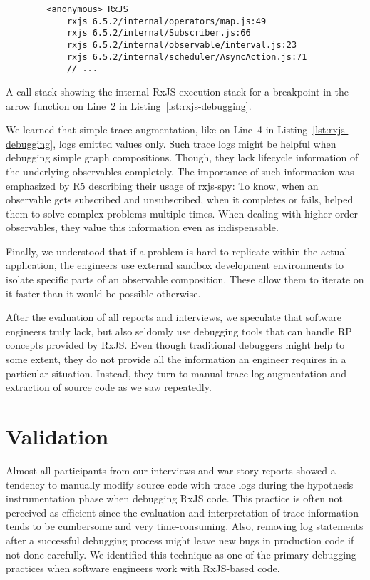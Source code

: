 \documentclass[sigplan,screen,review]{acmart}
\begin{document}
\begin{listing}
	\begin{verbatim}
		<anonymous> RxJS
			rxjs 6.5.2/internal/operators/map.js:49
			rxjs 6.5.2/internal/Subscriber.js:66
			rxjs 6.5.2/internal/observable/interval.js:23
			rxjs 6.5.2/internal/scheduler/AsyncAction.js:71
			// ...
	\end{verbatim}
	\caption{A call stack showing the internal RxJS execution stack for a breakpoint in the arrow function on Line~2 in Listing~\ref{lst:rxjs-debugging}.}
	\label{lst:rxjs-call-stack}
\end{listing}

We learned that simple trace augmentation, like on Line~4 in Listing~\ref{lst:rxjs-debugging}, logs emitted values only. Such trace logs might be helpful when debugging simple graph compositions. Though, they lack lifecycle information of the underlying observables completely. The importance of such information was emphasized by R5 describing their usage of rxjs-spy: To know, when an observable gets subscribed and unsubscribed, when it completes or fails, helped them to solve complex problems multiple times. When dealing with higher-order observables, they value this information even as indispensable.

Finally, we understood that if a problem is hard to replicate within the actual application, the engineers use external sandbox development environments to isolate specific parts of an observable composition. These allow them to iterate on it faster than it would be possible otherwise.

After the evaluation of all reports and interviews, we speculate that software engineers truly lack, but also seldomly use debugging tools that can handle RP concepts provided by RxJS. Even though traditional debuggers might help to some extent, they do not provide all the information an engineer requires in a particular situation. Instead, they turn to manual trace log augmentation and extraction of source code as we saw repeatedly.


\section{Validation}
\label{sec:study}

Almost all participants from our interviews and war story reports showed a tendency to manually modify source code with trace logs during the hypothesis instrumentation phase when debugging RxJS code. This practice is often not perceived as efficient since the evaluation and interpretation of trace information tends to be cumbersome and very time-consuming. Also, removing log statements after a successful debugging process might leave new bugs in production code if not done carefully. We identified this technique as one of the primary debugging practices when software engineers work with RxJS-based code.
\end{document}
